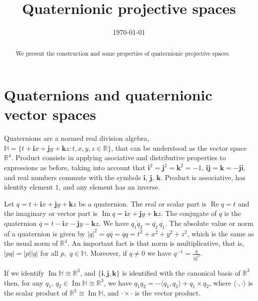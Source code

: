 \documentclass[12pt, a4paper]{amsart}
\newcommand{\R}{\mathbb{R}}
\renewcommand{\H}{\mathbb{H}}
\renewcommand{\Re}{\operatorname{Re}}
\renewcommand{\Im}{\operatorname{Im}}
\theoremstyle{remark}
\begin{document}
\title{Quaternionic projective spaces}

\begin{abstract}
We present the construction and some properties of quaternionic projective spaces.
\end{abstract}

\date{\today}
\maketitle

\section{Quaternions and quaternionic vector spaces}

Quaternions are a normed real division algebra,  
{$\H=\{t+\mathbf{i}x+\mathbf{j}y+\mathbf{k}z:t,x,y,z\in\R\}$}, that can be understood as the vector space $\R^4$. 
Product consists in applying asociative and distributive properties to expressions as before, 
taking into account that $\mathbf{i}^2=\mathbf{j}^2=\mathbf{k}^2=-1$, $\mathbf{i}\mathbf{j}=\mathbf{k}=-\mathbf{j}\mathbf{i}$, and real numbers commute with the symbols 
$\mathbf{i}$, $\mathbf{j}$, $\mathbf{k}$. 
Product is associative, has identity element $1$, and any element has an inverse.

Let $q=t+\mathbf{i}x+\mathbf{j}y+\mathbf{k}z$ be a quaternion. 
The real or scalar part is $\Re{q}=t$ and the imaginary or vector part is 
$\Im{q}=\mathbf{i}x+\mathbf{j}y+\mathbf{k}z$. 
The {conjugate} of $q$ is the quaternion $\overline{q}=t-\mathbf{i}x-\mathbf{j}y-\mathbf{k}z$. 
We have $\overline{q_1 q_2}=\overline{q_2}\,\overline{q_1}$. 
The absolute value or norm of a quaternion is given by
$\lvert q\rvert^2=q\overline{q}=\overline{q}q=t^2+x^2+y^2+z^2$, 
which is the same as the usual norm of $\R^4$. 
An important fact is that norm is multiplicative, that is,
$\lvert pq\rvert=\lvert p\rvert\lvert q\rvert$ for all $p$,~$q\in\H$. 
Moreover, if $q\neq 0$ we have $q^{-1}=\frac{\overline{q}}{\lvert q\rvert^2}$.

If we identify $\Im\H\cong\R^3$, and $\{\mathbf{i},\mathbf{j},\mathbf{k}\}$ is identified with the canonical basis of $\R^3$ then, for any $q_1$, $q_2\in\Im{\H}\cong\R^3$, we have $q_1 q_2=-\langle q_1,q_2\rangle+q_1\times q_2$,
where $\langle\cdot,\cdot\rangle$ is the scalar product of $\R^3\cong\Im\H$, 
and $\cdot\times\cdot$ is the vector product. 
\end{document}
